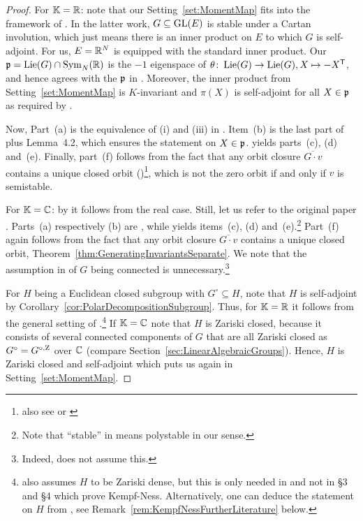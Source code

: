 \begin{proof}
	For $\mathbb K = \mathbb R$: note that our Setting~\ref{set:MomentMap} fits into the framework of \cite{RichardsonSlodowy}. In the latter work, $G \subseteq \operatorname{GL}(E)$ is stable under a Cartan involution, which just means there is an inner product on $E$ to which $G$ is self-adjoint. For us, $E = \mathbb R^N$ is equipped with the standard inner product. Our $\mathfrak{p} = \operatorname{Lie}(G) \cap \operatorname{Sym}_N(\mathbb R)$ is the $-1$ eigenspace of $\theta \colon \operatorname{Lie}(G) \to \operatorname{Lie}(G), X \mapsto -X^{\mathsf{T}}$, and hence agrees with the $\mathfrak{p}$ in \cite{RichardsonSlodowy}. Moreover, the inner product from Setting~\ref{set:MomentMap} is $K$-invariant and $\pi(X)$ is self-adjoint for all $X \in \mathfrak{p}$ as required by \cite[§3]{RichardsonSlodowy}.
	
	Now, Part~(a) is the equivalence of (i) and (iii) in \cite[Theorem~4.3]{RichardsonSlodowy}. Item~(b) is the last part of \cite[Theorem~4.3]{RichardsonSlodowy} plus Lemma~4.2, which ensures the statement on $X \in \mathfrak{p}$. \cite[Theorem~4.4]{RichardsonSlodowy} yields parts~(c), (d) and~(e).
	Finally, part~(f) follows from the fact that any orbit closure $\overline{G \cdot v}$ contains a unique closed orbit (\cite[Theoreme~2.7]{luna1975sur})\footnote{also see \cite[§9.3]{RichardsonSlodowy} or \cite[Theorem~1.1(iii)]{RealGIT}}, which is not the zero orbit if and only if $v$ is semistable.
	
	For $\mathbb K = \mathbb C$: by \cite[Remark~4.5(d)]{RichardsonSlodowy} it follows from the real case. Still, let us refer to the original paper \cite{KempfNess}.
	Parts~(a) respectively (b) are \cite[Theorem~0.1(a) respectively (b)]{KempfNess}, while \cite[Theorem~0.2]{KempfNess} yields items~(c), (d) and~(e).\footnote{Note that ``stable'' in \cite{KempfNess} means polystable in our sense.} Part~(f) again follows from the fact that any orbit closure $\overline{G \cdot v}$ contains a unique closed orbit, Theorem~\ref{thm:GeneratingInvariantsSeparate}. We note that the assumption in \cite{KempfNess} of $G$ being connected is unnecessary.\footnote{Indeed, \cite{RichardsonSlodowy} does not assume this.}
	
	For $H$ being a Euclidean closed subgroup with $G^\circ \subseteq H$, note that $H$ is self-adjoint by Corollary~\ref{cor:PolarDecompositionSubgroup}. Thus, for $\mathbb K = \mathbb R$ it follows from the general setting of \cite{RichardsonSlodowy}.\footnote{\cite{RichardsonSlodowy} also assumes $H$ to be Zariski dense, but this is only needed in \cite[§6]{RichardsonSlodowy} and not in §3 and §4 which prove Kempf-Ness. Alternatively, one can deduce the statement on $H$ from \cite{RealGIT}, see Remark~\ref{rem:KempfNessFurtherLiterature} below.}
	If $\mathbb K = \mathbb C$ note that $H$ is Zariski closed, because it consists of several connected components of $G$ that are all Zariski closed as $G^\circ = G^{\circ, \operatorname{Z}}$ over $\mathbb C$ (compare Section~\ref{sec:LinearAlgebraicGroups}). Hence, $H$ is Zariski closed and self-adjoint which puts us again in Setting~\ref{set:MomentMap}.
\end{proof}

